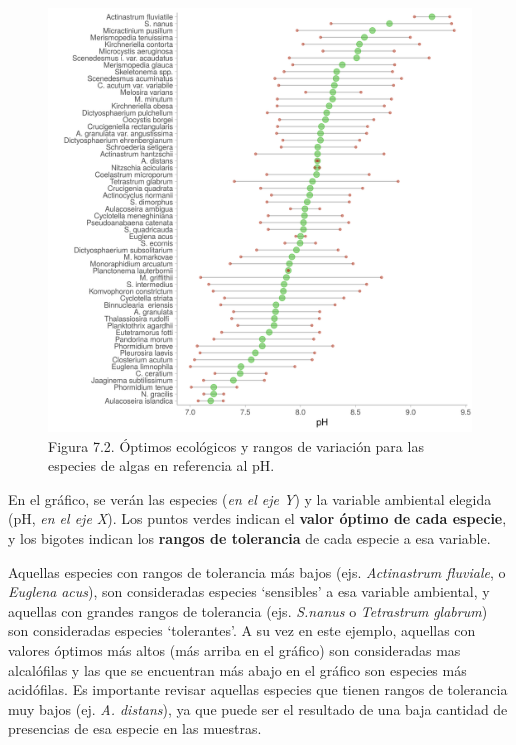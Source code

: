 \documentclass[
]{book}
\begin{document}
\begin{figure}
\centering
\includegraphics{./images/plot_optimosPrime.png}
\caption{Figura 7.2. Óptimos ecológicos y rangos de variación para las especies de algas en referencia al pH.}
\end{figure}

En el gráfico, se verán las especies (\emph{en el eje Y}) y la variable ambiental elegida (pH, \emph{en el eje X}). Los puntos verdes indican el \textbf{valor óptimo de cada especie}, y los bigotes indican los \textbf{rangos de tolerancia} de cada especie a esa variable.

Aquellas especies con rangos de tolerancia más bajos (ejs. \emph{Actinastrum fluviale}, o \emph{Euglena} \emph{acus}), son consideradas especies `sensibles' a esa variable ambiental, y aquellas con grandes rangos de tolerancia (ejs. \emph{S.nanus} o \emph{Tetrastrum} \emph{glabrum}) son consideradas especies `tolerantes'. A su vez en este ejemplo, aquellas con valores óptimos más altos (más arriba en el gráfico) son consideradas mas alcalófilas y las que se encuentran más abajo en el gráfico son especies más acidófilas. Es importante revisar aquellas especies que tienen rangos de tolerancia muy bajos (ej. \emph{A. distans}), ya que puede ser el resultado de una baja cantidad de presencias de esa especie en las muestras.
\end{document}

